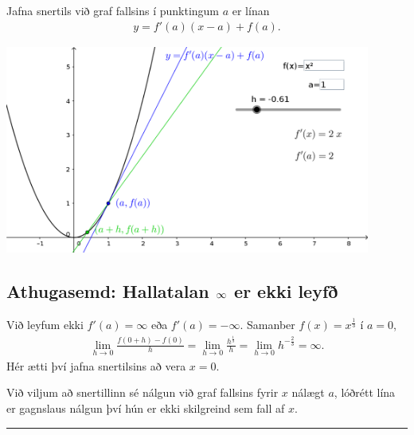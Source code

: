 \documentclass[b5paper,11pt,icelandic]{sphinxmanual}
\begin{document}
Jafna snertils við graf fallsins í punktingum \(a\) er línan
\begin{equation*}
\begin{split}y = f'(a)(x-a) + f(a).\end{split}
\end{equation*}

\begin{center}
\includegraphics[width=12cm,keepaspectratio=true]{./01_05_snertill.png}
\end{center}



\subsection{Athugasemd: Hallatalan \protect\(\infty\protect\) er ekki leyfð}
\label{kafli03:athugasemd-hallatalan-er-ekki-leyf}
Við leyfum ekki \(f'(a) = \infty\) eða
\(f'(a) = -\infty\). Samanber
\(f(x) = x^{\frac 13}\) í \(a=0\),
\begin{equation*}
\begin{split}\lim_{h \to 0} \frac{f(0+h)-f(0)}h =
     \lim_{h \to 0} \frac{h^{\frac 13}}h =
    \lim_{h \to 0} h^{-\frac 23} = \infty.\end{split}
\end{equation*}
Hér ætti því jafna snertilsins að vera \(x=0\).


Við viljum að snertillinn sé nálgun við graf fallsins fyrir \(x\) nálægt
\(a\), lóðrétt lína er gagnslaus nálgun því hún er ekki skilgreind sem
fall af \(x\).


\bigskip\hrule{}\bigskip
\end{document}
